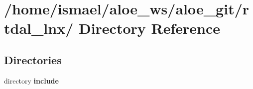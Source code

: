 \section{/home/ismael/aloe\-\_\-ws/aloe\-\_\-git/rtdal\-\_\-lnx/ Directory Reference}
\label{dir_ed8a377acd1fe5c8a6e0abea093cd2b7}
\subsection*{Directories}
\begin{DoxyCompactItemize}
\item 
directory {\bf include}
\end{DoxyCompactItemize}

